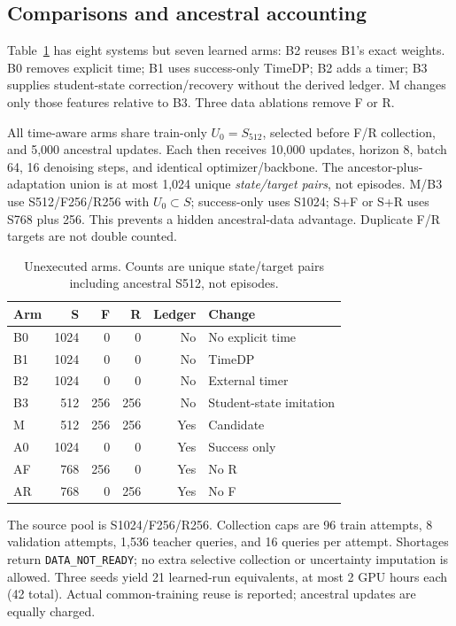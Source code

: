 \documentclass{article}
\begin{document}
\subsection{Comparisons and ancestral accounting}
Table~\ref{tab:arms} has eight systems but seven learned arms: B2 reuses B1's exact weights. B0 removes explicit time; B1 uses success-only TimeDP; B2 adds a timer; B3 supplies student-state correction/recovery without the derived ledger. M changes only those features relative to B3. Three data ablations remove F or R.

All time-aware arms share train-only \(U_0=S_{512}\), selected before F/R collection, and 5,000 ancestral updates. Each then receives 10,000 updates, horizon 8, batch 64, 16 denoising steps, and identical optimizer/backbone. The ancestor-plus-adaptation union is at most 1,024 unique \emph{state/target pairs}, not episodes. M/B3 use S512/F256/R256 with \(U_0\subset S\); success-only uses S1024; S+F or S+R uses S768 plus 256. This prevents a hidden ancestral-data advantage. Duplicate F/R targets are not double counted.

\begin{table}[t]
\caption{Unexecuted arms. Counts are unique state/target pairs including ancestral S512, not episodes.}
\label{tab:arms}\centering\small\setlength{\tabcolsep}{4pt}
\begin{tabular}{lrrrrl}\toprule
Arm&S&F&R&Ledger&Change\\\midrule
B0&1024&0&0&No&No explicit time\\
B1&1024&0&0&No&TimeDP\\
B2&1024&0&0&No&External timer\\
B3&512&256&256&No&Student-state imitation\\
M&512&256&256&Yes&Candidate\\
A0&1024&0&0&Yes&Success only\\
AF&768&256&0&Yes&No R\\
AR&768&0&256&Yes&No F\\\bottomrule
\end{tabular}
\end{table}

The source pool is S1024/F256/R256. Collection caps are 96 train attempts, 8 validation attempts, 1,536 teacher queries, and 16 queries per attempt. Shortages return \texttt{DATA\_NOT\_READY}; no extra selective collection or uncertainty imputation is allowed. Three seeds yield 21 learned-run equivalents, at most 2 GPU hours each (42 total). Actual common-training reuse is reported; ancestral updates are equally charged.
\end{document}
